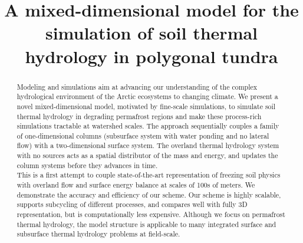 \documentclass[review]{elsarticle}
\begin{document}
\begin{frontmatter}

\title{A mixed-dimensional model for the simulation of soil thermal hydrology in polygonal tundra}





\begin{abstract}
Modeling and simulations aim at advancing our understanding of the complex hydrological environment of the Arctic ecosystems to changing climate.
We present a novel mixed-dimensional model, motivated by fine-scale simulations, to simulate soil thermal hydrology in degrading permafrost regions and make these process-rich simulations tractable at watershed scales. The approach sequentially couples a family of one-dimensional columns (subsurface system with water ponding and no lateral flow) with a two-dimensional surface system. The overland thermal hydrology system with no sources acts as a spatial distributor of the mass and energy, and updates the column systems before they advances in time. \\
This is a first attempt to couple state-of-the-art representation of freezing soil physics with overland flow and surface energy balance at scales of 100s of meters. 
We demonstrate the accuracy and efficiency of our scheme. Our scheme is highly scalable, supports subcycling of different processes, and compares well with fully 3D representation, but is computationally less expensive. Although we focus on permafrost thermal hydrology, the model structure is applicable to many integrated surface and subsurface thermal hydrology problems at field-scale.
\end{abstract}


\end{frontmatter}
\end{document}
